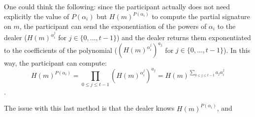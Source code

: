 One could think the following: since the participant actually does not need explicitly the value of $P(\alpha_i)$ but $H(m)^{P(\alpha_i)}$ to compute the partial signature on $m$, the participant can send the exponentiation of the powers of $\alpha_i$ to the dealer ($H(m)^{\alpha_i^j}$ for $j \in \{0, ..., t-1 \}$) and the dealer returns them exponentiated to the coefficients of the polynomial ($\left(H(m)^{\alpha_i^j}\right)^{a_j}$ for $j \in \{0, ..., t-1 \}$). In this way, the participant can compute: $$H(m)^{P(\alpha_i)} = \prod_{0\leq j \leq t-1} \left(H(m)^{\alpha_i^j}\right)^{a_j} = H(m)^{\sum_{0\leq j \leq t-1} a_j \alpha_i^j}$$.

The issue with this last method is that the dealer knows $H(m)^{P(\alpha_i)}$, and
